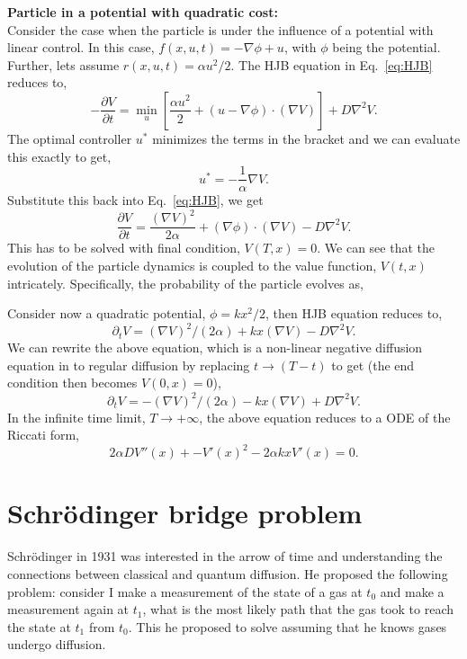 \documentclass[11pt]{article}
\def\grad{\vec{\nabla}}
\def\grad{\nabla}
\begin{document}
\begin{singlespace}
\begin{tcolorbox}[colback=gray!20!white,colframe=white,arc=8pt,outer arc=8pt]
    \textbf{\textsf{Particle in a potential with quadratic cost:}}\\[5pt]
    Consider the case when the particle is under the influence of a potential with linear control. In this case, $f(x, u, t) = -\grad \phi + u$, with $\phi$ being the potential. Further, lets assume $r(x, u, t) = \alpha u^2/2$. The HJB equation in Eq.~\ref{eq:HJB} reduces to,
    \[
    -\frac{\partial V}{\partial t} = \min_{u} \left[ \frac{\alpha u^2}{2} + (u-\nabla \phi) \cdot (\grad V) \right] + D \grad^2 V.
    \]
    The optimal controller $u^*$ minimizes the terms in the bracket and we can evaluate this exactly to get,
    \[
    u^* = - \frac{1}{\alpha} \grad V.
    \]
    Substitute this back into Eq.~\ref{eq:HJB}, we get
    \[
    \frac{\partial V}{\partial t} = \frac{(\grad V)^2}{2 \alpha} + (\nabla \phi) \cdot (\grad V) - D \grad^2 V.
    \]
    This has to be solved with final condition, $V(T,x) = 0$. We can see that the evolution of the particle dynamics is coupled to the value function, $V(t, x)$ intricately. Specifically, the probability of the particle evolves as,

    Consider now a quadratic potential, $\phi = kx^2/2$, then HJB equation reduces to,
    \[
    \partial_t V = (\grad V)^2/{(2 \alpha)} + kx (\grad V) - D \grad^2 V.
    \]
    We can rewrite the above equation, which is a non-linear negative diffusion equation in to regular diffusion by replacing $t \rightarrow (T-t)$ to get (the end condition then becomes $V(0, x) = 0$),
    \[
    \partial_t V = -(\grad V)^2/{(2 \alpha)} - kx (\grad V) + D \grad^2 V.
    \]
    In the infinite time limit, $T \rightarrow + \infty$, the above equation reduces to a ODE of the Riccati form,
    \[
    2 \alpha D V''(x) + -V'(x)^2 - 2\alpha kx V'(x) = 0.
    \]
\end{tcolorbox}

\section{Schr\"odinger bridge problem}
Schr\"odinger in 1931 was interested in the arrow of time and understanding the connections between classical and quantum diffusion. He proposed the following problem: consider I make a measurement of the state of a gas at $t_0$ and make a measurement again at $t_1$, what is the most likely path that the gas took to reach the state at $t_1$ from $t_0$. This he proposed to solve assuming that he knows gases undergo diffusion.


\end{singlespace}
\end{document}
